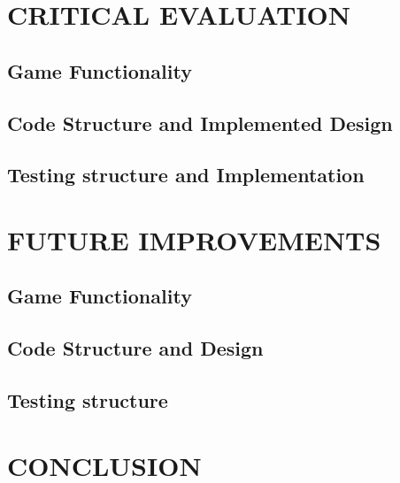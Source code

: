 \documentclass[10pt,twocolumn]{witseiepaper}
\begin{document}
\section{CRITICAL EVALUATION}

\subsection{Game Functionality}

\subsection{Code Structure and Implemented Design}

\subsection{Testing structure and Implementation}

\section{FUTURE IMPROVEMENTS}

\subsection{Game Functionality}

\subsection{Code Structure and Design}

\subsection{Testing structure}

\section{CONCLUSION}

%



\end{document}
